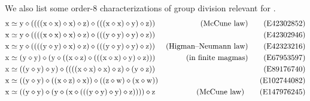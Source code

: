 We also list some order-$8$ characterizations of group division relevant for .
\begin{align}
        \x &\formaleq \y \op ((((\x \op \x) \op \x) \op \z) \op (((\x \op \x) \op \y) \op \z)) & \hbox{(McCune law)} \label{eq42302852}\tag{E42302852} \\
        \x &\formaleq \y \op ((((\x \op \x) \op \x) \op \z) \op (((\y \op \y) \op \y) \op \z)) & \label{eq42302946}\tag{E42302946} \\
        \x &\formaleq \y \op ((((\y \op \y) \op \x) \op \z) \op (((\y \op \y) \op \y) \op \z)) & \hbox{(Higman--Neumann law)} \label{eq42323216}\tag{E42323216} \\
        \x &\formaleq (\y \op \y) \op (\y \op ((\x \op \z) \op (((\x \op \x) \op \y) \op \z))) & \hbox{(in finite magmas)} \label{eq67953597}\tag{E67953597} \\
        \x &\formaleq ((\y \op \y) \op \y) \op ((((\x \op \x) \op \x) \op \z) \op (\y \op \z)) & \label{eq89176740}\tag{E89176740} \\
        \x &\formaleq ((\y \op \y) \op ((\x \op \z) \op \x)) \op ((\z \op \w) \op (\x \op \w)) & \label{eq102744082}\tag{E102744082} \\
        \x &\formaleq ((\y \op \y) \op (\y \op (\x \op (((\y \op \y) \op \y) \op \z)))) \op \z & \hbox{(McCune law)} \label{eq147976245}\tag{E147976245}
\end{align}
\endgroup
